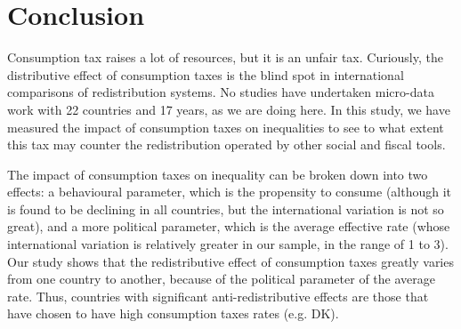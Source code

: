 \documentclass[12pt]{article}
\begin{document}


%
%
%


\section*{Conclusion}

Consumption tax raises a lot of resources, but it is an unfair tax. Curiously, the distributive effect of consumption taxes is the blind spot in international comparisons of redistribution systems. No studies have undertaken micro-data work with 22 countries and 17 years, as we are doing here. In this study, we have measured the impact of consumption taxes on inequalities to see to what extent this tax may counter the redistribution operated by other social and fiscal tools. 

The impact of consumption taxes on inequality can be broken down into two effects: a behavioural parameter, which is the propensity to consume (although it is found to be declining in all countries, but the international variation is not so great), and a more political parameter, which is the average effective rate (whose international variation is relatively greater in our sample, in the range of 1 to 3). Our study shows that the redistributive effect of consumption taxes greatly varies from one country to another, because of the political parameter of the average rate. Thus, countries with significant anti-redistributive effects are those that have chosen to have high consumption taxes rates (e.g. DK). 
\end{document}
